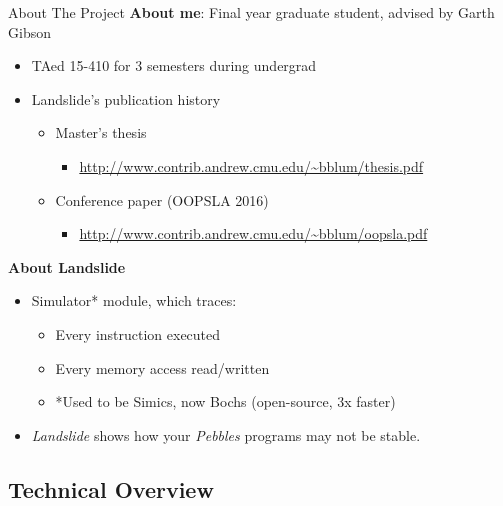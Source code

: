 \documentclass[xcolor=dvipsnames]{beamer}
\begin{document}
\begin{frame}{About The Project}
	\textbf{About me}: Final year graduate student, advised by Garth Gibson
	\begin{itemize}
		\item TAed 15-410 for 3 semesters during undergrad
		\item Landslide's publication history
		\begin{itemize}
			\item Master's thesis
			\begin{itemize}
				\item \url{http://www.contrib.andrew.cmu.edu/~bblum/thesis.pdf}
			\end{itemize}
			\item Conference paper (OOPSLA 2016)
			\begin{itemize}
				\item \url{http://www.contrib.andrew.cmu.edu/~bblum/oopsla.pdf}
			\end{itemize}
		\end{itemize}
	\end{itemize}
	\pause
	\linegap

	{\bf About Landslide}
	\begin{itemize}
		\item Simulator* module, which traces:
			\begin{itemize}
				\item Every instruction executed
				\item Every memory access read/written
				\item *Used to be Simics, now Bochs (open-source, 3x faster)
			\end{itemize}
		\item {\em Landslide} shows how your {\em Pebbles} programs may not be stable.
	\end{itemize}
\end{frame}


\subsection{Technical Overview}
\end{document}
